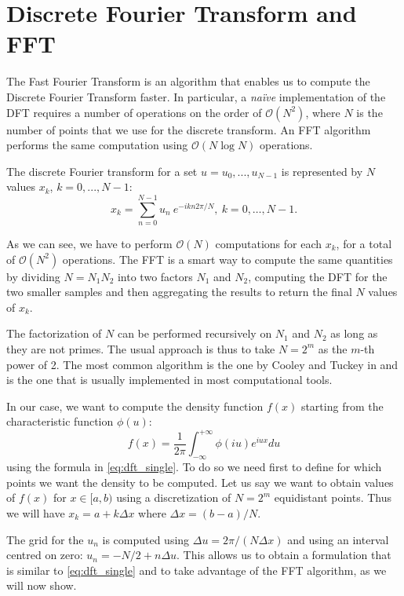 \chapter{Discrete Fourier Transform and FFT}
\label{app:FFT}

The Fast Fourier Transform is an algorithm that enables us to compute the Discrete Fourier Transform faster. In particular, a \textit{na\"ive} implementation of the DFT requires a number of operations on the order of $\mathcal{O}(N^2)$, where $N$ is the number of points that we use for the discrete transform. An FFT algorithm performs the same computation using $\mathcal{O}(N \log N)$ operations.


 The discrete Fourier transform for a set $u = u_0 , ..., u_{N-1}$ is  represented by $N$ values $x_k$, $k=0, ..., N-1$:
\begin{equation}
\label{eq:dft_single}
	x_k = \sum_{n=0}^{N-1} u_n \:e^{-i  k n 2\pi / N}, \: k= 0, \dots, N-1.
\end{equation}


As we can see, we have to perform $\mathcal{O}(N)$ computations for each $x_k$, for a total of $\mathcal{O}(N^2)$ operations.
The FFT is a smart way to compute the same quantities by dividing $ N = N_1N_2$ into two factors $ N_1$ and $N_2$, computing the DFT for the two smaller samples and then aggregating the results to return the final $N$ values of $x_k$.

The factorization of $N$ can be performed recursively on $N_1$ and $N_2$ as long as they are not primes. The usual approach is thus to take $N=2^m$ as the $m$-th power of 2. 
The most common algorithm is the one by Cooley and Tuckey in \cite{COOLEY_FFT} and is the one that is usually implemented in most computational tools.


In our case, we want to compute the density function $f(x)$ starting from the characteristic function $\phi(u)$:
\begin{equation}
\label{eq:general_pdf_chf}
f(x) = \frac{1}{2\pi}\int_{-\infty}^{+\infty} \phi(iu) e^{i u x} du
\end{equation}
 using the formula in \eqref{eq:dft_single}. To do so we need first to define for which points we want the density to be computed.
 Let us say we want to obtain values of $f(x)$ for $x\in [a, b)$ using a discretization of $N=2^m$ equidistant points.
 Thus we will have $x_k = a + k \Delta x$ where $\Delta x = (b-a)/N$. 
 
The grid for the $u_n$ is computed using $\Delta u = 2 \pi /(N \Delta x)$ and using an interval centred on zero: $u_n = - N/2 + n \Delta u$. This allows us to obtain a formulation that is similar to \eqref{eq:dft_single} and to take advantage of the FFT algorithm, as we will now show.
 
